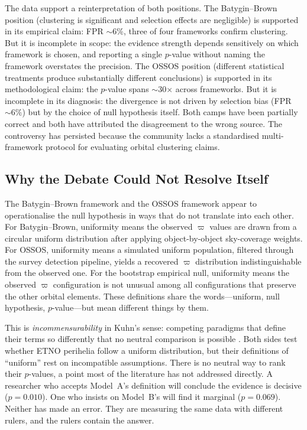 \documentclass[usenatbib]{mnras}
\begin{document}
The data support a reinterpretation of both positions. The Batygin--Brown position (clustering is significant and selection effects are negligible) is supported in its empirical claim: FPR $\sim6\%$, three of four frameworks confirm clustering. But it is incomplete in scope: the evidence strength depends sensitively on which framework is chosen, and reporting a single $p$-value without naming the framework overstates the precision. The OSSOS position (different statistical treatments produce substantially different conclusions) is supported in its methodological claim: the $p$-value spans $\sim$30$\times$ across frameworks. But it is incomplete in its diagnosis: the divergence is not driven by selection bias (FPR $\sim6\%$) but by the choice of null hypothesis itself. Both camps have been partially correct and both have attributed the disagreement to the wrong source. The controversy has persisted because the community lacks a standardised multi-framework protocol for evaluating orbital clustering claims.

\subsection{Why the Debate Could Not Resolve Itself}

The Batygin--Brown framework and the OSSOS framework appear to operationalise the null hypothesis in ways that do not translate into each other. For Batygin--Brown, uniformity means the observed $\varpi$ values are drawn from a circular uniform distribution after applying object-by-object sky-coverage weights. For OSSOS, uniformity means a simulated uniform population, filtered through the survey detection pipeline, yields a recovered $\varpi$ distribution indistinguishable from the observed one. For the bootstrap empirical null, uniformity means the observed $\varpi$ configuration is not unusual among all configurations that preserve the other orbital elements. These definitions share the words---uniform, null hypothesis, $p$-value---but mean different things by them.

This is \textit{incommensurability} in Kuhn's sense: competing paradigms that define their terms so differently that no neutral comparison is possible \citep{kuhn1962}. Both sides test whether ETNO perihelia follow a uniform distribution, but their definitions of ``uniform'' rest on incompatible assumptions. There is no neutral way to rank their $p$-values, a point most of the literature has not addressed directly. A researcher who accepts Model~A's definition will conclude the evidence is decisive ($p=0.010$). One who insists on Model~B's will find it marginal ($p=0.069$). Neither has made an error. They are measuring the same data with different rulers, and the rulers contain the answer.
\end{document}
